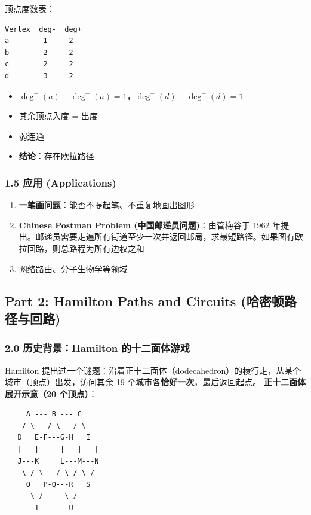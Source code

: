 \documentclass[10pt,a4paper,openany]{ctexbook}
\theoremstyle{definition}
\theoremstyle{remark}
\begin{document}
顶点度数表：
{\footnotesize\begin{verbatim}
Vertex  deg-  deg+
a        1     2
b        2     2
c        2     2
d        3     2
\end{verbatim}}

\begin{itemize}
\item $\deg^+(a) - \deg^-(a) = 1$，$\deg^-(d) - \deg^+(d) = 1$
\item 其余顶点入度 = 出度
\item 弱连通
\item \textbf{结论}：存在欧拉路径

\end{itemize}

\vspace{-2pt}

\subsubsection{1.5 应用 (Applications)}

\begin{enumerate}
\item \textbf{一笔画问题}：能否不提起笔、不重复地画出图形
\item \textbf{Chinese Postman Problem (中国邮递员问题)}：由管梅谷于 1962 年提出。邮递员需要走遍所有街道至少一次并返回邮局，求最短路径。如果图有欧拉回路，则总路程为所有边权之和
\item 网络路由、分子生物学等领域

\end{enumerate}

\vspace{-2pt}

\subsection{Part 2: Hamilton Paths and Circuits (哈密顿路径与回路)}

\subsubsection{2.0 历史背景：Hamilton 的十二面体游戏}

Hamilton 提出过一个谜题：沿着正十二面体（dodecahedron）的棱行走，从某个城市（顶点）出发，访问其余 19 个城市各\textbf{恰好一次}，最后返回起点。
\textbf{正十二面体展开示意（20 个顶点）}：
{\footnotesize\begin{verbatim}
     A --- B --- C
    / \   / \   / \
   D   E-F---G-H   I
   |   |     |   |   |
   J---K     L---M---N
    \ / \   / \ / \ /
     O   P-Q---R   S
      \ /     \ /
       T       U
\end{verbatim}}
\end{document}
